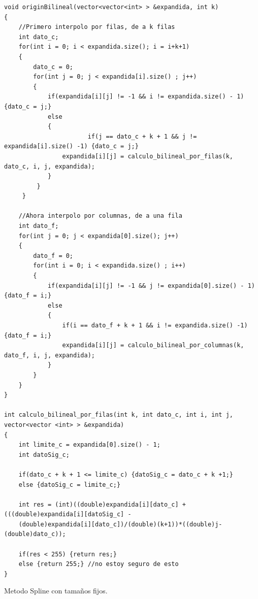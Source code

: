 \documentclass[a4paper]{article}
\newcounter{col}
\begin{document}
\begin{verbatim}
void originBilineal(vector<vector<int> > &expandida, int k)
{
    //Primero interpolo por filas, de a k filas
    int dato_c;
    for(int i = 0; i < expandida.size(); i = i+k+1)
    {
        dato_c = 0;
        for(int j = 0; j < expandida[i].size() ; j++)
        {
            if(expandida[i][j] != -1 && i != expandida.size() - 1) {dato_c = j;}
            else
            {
            		   if(j == dato_c + k + 1 && j != expandida[i].size() -1) {dato_c = j;}
                expandida[i][j] = calculo_bilineal_por_filas(k, dato_c, i, j, expandida);
            }
         }
     }

	//Ahora interpolo por columnas, de a una fila
    int dato_f;
    for(int j = 0; j < expandida[0].size(); j++)
    {
        dato_f = 0;
        for(int i = 0; i < expandida.size() ; i++)
        {
            if(expandida[i][j] != -1 && j != expandida[0].size() - 1) {dato_f = i;}
            else
            {
                if(i == dato_f + k + 1 && i != expandida.size() -1) {dato_f = i;}
                expandida[i][j] = calculo_bilineal_por_columnas(k, dato_f, i, j, expandida);
            }
        }
    }
}

int calculo_bilineal_por_filas(int k, int dato_c, int i, int j, vector<vector <int> > &expandida)
{
    int limite_c = expandida[0].size() - 1;
    int datoSig_c;

    if(dato_c + k + 1 <= limite_c) {datoSig_c = dato_c + k +1;}
    else {datoSig_c = limite_c;}

    int res = (int)((double)expandida[i][dato_c] + (((double)expandida[i][datoSig_c] -
    (double)expandida[i][dato_c])/(double)(k+1))*((double)j-(double)dato_c));

    if(res < 255) {return res;}
    else {return 255;} //no estoy seguro de esto
}
\end{verbatim}

Metodo Spline con tamaños fijos.
\end{document}
